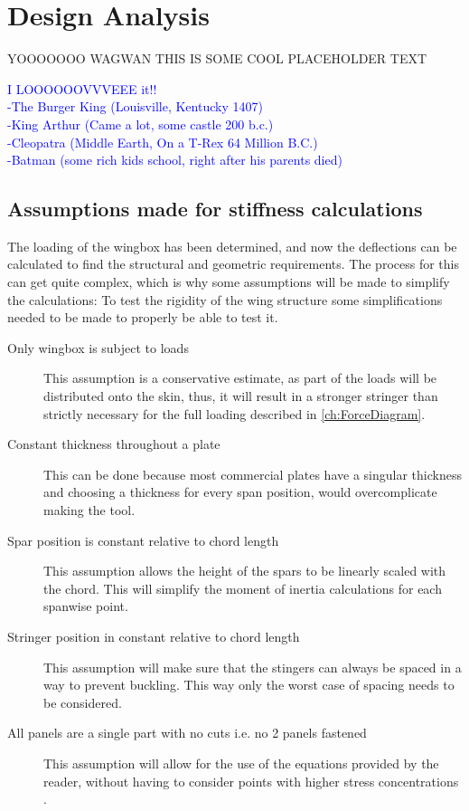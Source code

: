 \chapter{Design Analysis}
\label{ch:Design Analysis}



YOOOOOOO WAGWAN THIS IS SOME COOL PLACEHOLDER TEXT

\textcolor{blue}{I LOOOOOOVVVEEE it!! \\
    -The Burger King (Louisville, Kentucky 1407)\\
        -King Arthur (Came a lot, some castle 200 b.c.)\\
            -Cleopatra (Middle Earth, On a T-Rex 64 Million B.C.)\\
                -Batman (some rich kids school, right after his parents died)}
\section{Assumptions made for stiffness calculations}
The loading of the wingbox has been determined, and now the deflections can be calculated to find the structural and geometric requirements. The process for this can get quite complex, which is why some  assumptions will be made to simplify the calculations:
    To test the rigidity of the wing structure some simplifications needed to be made to properly be able to test it.
\begin{description}
    \item[Only wingbox is subject to loads] This assumption is a conservative estimate, as part of the loads will be distributed onto the skin, thus, it will result in a stronger stringer than strictly necessary for the full loading described in \autoref{ch:ForceDiagram}.
    
    \item[Constant thickness throughout a plate] This can be done because most commercial plates have a singular thickness and choosing a thickness for every span position, would overcomplicate making the tool.

    \item[Spar position is constant relative to chord length] This assumption allows the height of the spars to be linearly scaled with the chord. This will simplify the moment of inertia calculations for each spanwise point.

    \item[Stringer position in constant relative to chord length] This assumption will make sure that the stingers can always be spaced in a way to prevent buckling. This way only the worst case of spacing needs to be considered.

    \item[All panels are a single part with no cuts i.e. no 2 panels fastened] This assumption will allow for the use of the equations provided by the reader, without having to consider points with higher stress concentrations \cite{Timmer2024Project5}.
\end{description}
    
